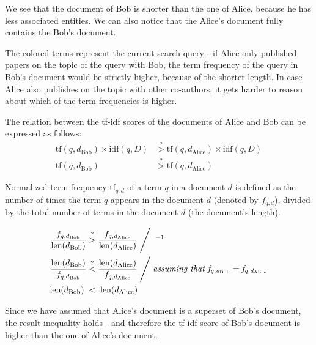We see that the document of Bob is shorter than the one of Alice, because he has less associated entities. We can also notice that the Alice's document fully contains the Bob's document.
    
The colored terms represent the current search query - if Alice only published papers on the topic of the query with Bob, the term frequency of the 
query in Bob's document would be strictly higher, because of the shorter length.
In case Alice also publishes on the topic with other co-authors, it gets harder to reason about which of the term frequencies is higher.

The relation between the tf-idf scores of the documents of Alice and Bob can be expressed as follows:
\begin{subequations}
\begin{align}
\text{tf}(q, d_{\text{Bob}}) \times \text{idf}(q, D) &\stackrel{?}{>} \text{tf}(q, d_{\text{Alice}}) \times \text{idf}(q, D) \\
\text{tf}(q, d_{\text{Bob}}) &\stackrel{?}{>} \text{tf}(q, d_{\text{Alice}})
\end{align}
\end{subequations}

Normalized term frequency $\text{tf}_{q,d}$ of a term $q$ in a document $d$ is defined as the number of times the term $q$ appears in the document $d$ (denoted by $f_{q,d}$),
divided by the total number of terms in the document $d$ (the document's length).

\begin{subequations}
\begin{align}
\frac{f_{q, d_{\text{Bob}}}}{\text{len}(d_{\text{Bob}})} &\stackrel{?}{>} \frac{f_{q, d_{\text{Alice}}}}{\text{len}(d_{\text{Alice}})} \Biggm/ \;^{-1} \\
\frac{\text{len}(d_{\text{Bob}})}{f_{q, d_{\text{Bob}}}} &\stackrel{?}{<} \frac{\text{len}(d_{\text{Alice}})}{f_{q, d_{\text{Alice}}}} \Biggm/ \textit{assuming that } \mathit{f_{q, d_{\text{Bob}}} = f_{q, d_{\text{Alice}}}} \label{eq:51assumption}\\
\text{len}(d_{\text{Bob}}) \;&<\;\text{len}(d_{\text{Alice}})
\end{align}
\end{subequations}

Since we have assumed that Alice's document is a superset of Bob's document, the result inequality holds - and therefore the tf-idf score of Bob's document is higher than the one of Alice's document.

